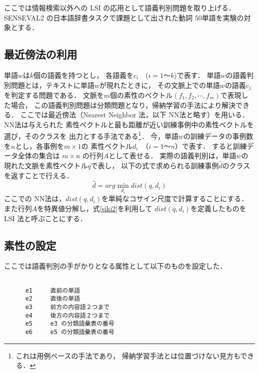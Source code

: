 ここでは情報検索以外への LSI の応用として語義判別問題を取り上げる．
SENSEVAL2 の日本語辞書タスクで課題として出された動詞 50単語を実験の対象とする．

\subsection{最近傍法の利用}

単語\( w \)は\( k \)個の語義を持つとし，
各語義を\( c_i \)\ \ (\(i = 1 〜 k\))で表す．
単語\( w \)の語義判別問題とは，テキストに単語\( w \)が現れたときに，
その文脈上での単語\( w \)の語義\( c_j \)を判定する問題である．
文脈を\( m \)個の素性のベクトル\( (f_1,f_2, \cdots, f_m )\)で表現した場合，
この語義判別問題は分類問題となり，帰納学習の手法により解決できる．
ここでは最近傍法（Nearest Neighbor 法，以下 NN法と略す）\cite{ishii}を用いる．NN法は与えられた
素性ベクトルと最も距離が近い訓練事例中の素性ベクトルを選び，そのクラスを
出力とする手法である\footnote{これは用例ベースの手法であり，
帰納学習手法とは位置づけない見方もできる．}．
今，単語\( w \)の訓練データの事例数を\( n \)とし，各事例を\( m \times 1 \)の
素性ベクトル\( d_i \)\ （\( i = 1 〜 n \)）で表す．
すると訓練データ全体の集合は \( m \times n \) の行列\( A \)として表せる．
実際の語義判別は，単語\( w \)の現れた文脈を素性ベクトル\( q \)で表し，
以下の式で求められる訓練事例\( \hat{d} \)のクラスを返すことで行える．
\[
\hat{d} = arg \min_{d_i} dist(q,d_i)
\]
\noindent
ここでの NN法は，\( dist(q,d_i) \)を単純なコサイン尺度で計算することにする．
また行列\( A \)を特異値分解し，\mbox{式\ref{siki2}}を利用して
\( dist(q,d_i) \)を定義したものを LSI 法と呼ぶことにする．

\subsection{素性の設定}

ここでは語義判別の手がかりとなる属性として以下のものを設定した．
\begin{verbatim}

      e1     直前の単語
      e2     直後の単語
      e3     前方の内容語２つまで
      e4     後方の内容語２つまで
      e5     e3 の分類語彙表の番号
      e6     e5 の分類語彙表の番号

\end{verbatim}

